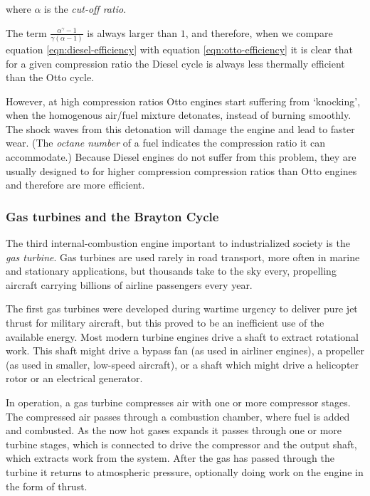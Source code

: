 where \(\alpha \) is the \textit{cut-off ratio}. 

The term \( \frac{\alpha^{\gamma}-1}{\gamma(\alpha-1)} \) is always larger
than \(1 \), and therefore, when we compare equation \ref{eqn:diesel-efficiency}
with equation \ref{eqn:otto-efficiency} it is clear that for a given
compression ratio the Diesel cycle is always less thermally efficient than the
Otto cycle. 

However, at high compression ratios Otto engines start suffering from
`knocking', when the homogenous air/fuel mixture detonates, instead of burning
smoothly. The shock waves from this detonation will damage the engine and lead
to faster wear. (The \textit{octane number} of a fuel indicates the compression
ratio it can accommodate.) Because Diesel engines do not suffer from this
problem, they are usually designed to for higher compression compression ratios
than Otto engines and therefore are more efficient.

\subsubsection{Gas turbines and the Brayton Cycle}

The third internal\hyp{}combustion engine important to industrialized society is
the \textit{gas turbine}. Gas turbines are used rarely in road transport, more
often in marine and stationary applications, but thousands take to the sky
every, propelling aircraft \autocite{Morris2017} carrying billions of airline
passengers every year.

The first gas turbines were developed during wartime urgency to deliver pure jet
thrust for military aircraft, but this proved to be an inefficient use of the
available energy. Most modern turbine engines drive a shaft to extract
rotational work. This shaft might drive a bypass fan (as used in airliner engines), a
propeller (as used in smaller, low-speed aircraft), or a shaft which might drive
a helicopter rotor or an electrical generator.

In operation, a gas turbine compresses air with one or more compressor stages.
The compressed air passes through a combustion chamber, where fuel is added and
combusted. As the now hot gases expands it passes through one or more turbine
stages, which is connected to drive the compressor and the output shaft, which
extracts work from the system. After the gas has passed through the turbine it
returns to atmospheric pressure, optionally doing work on the engine in the form
of thrust.

